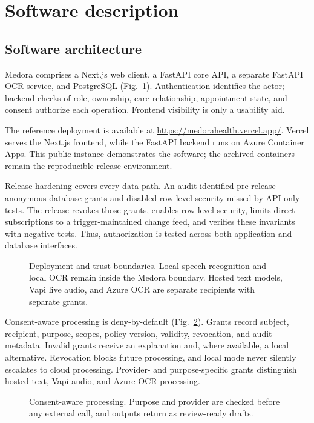 \documentclass[preprint,12pt,a4paper]{elsarticle}
\begin{document}
\section{Software description}

\subsection{Software architecture}

Medora comprises a Next.js web client, a FastAPI core API, a separate FastAPI OCR service,
and PostgreSQL (Fig.~\ref{fig:trust}). Authentication identifies the actor; backend checks
of role, ownership, care relationship, appointment state, and consent authorize each
operation. Frontend visibility is only a usability aid.

The reference deployment is available at
\url{https://medorahealth.vercel.app/}. Vercel serves the Next.js frontend, while the
FastAPI backend runs on Azure Container Apps. This public instance demonstrates the
software; the archived containers remain the reproducible release environment.

Release hardening covers every data path. An audit identified pre-release anonymous database
grants and disabled row-level security missed by API-only tests. The release revokes those
grants, enables row-level security, limits direct subscriptions to a trigger-maintained
change feed, and verifies these invariants with negative tests. Thus, authorization is
tested across both application and database interfaces.

\begin{figure}[!tb]
\centering
\caption{Deployment and trust boundaries. Local speech recognition and local OCR remain
inside the Medora boundary. Hosted text models, Vapi live audio, and Azure OCR are separate
recipients with separate grants.}
\label{fig:trust}
\end{figure}

Consent-aware processing is deny-by-default (Fig.~\ref{fig:consent}). Grants record subject,
recipient, purpose, scopes, policy version, validity, revocation, and audit metadata. Invalid
grants receive an explanation and, where available, a local alternative. Revocation blocks
future processing, and local mode never silently escalates to cloud processing. Provider-
and purpose-specific grants distinguish hosted text, Vapi audio, and Azure OCR processing.

\begin{figure}[!tb]
\centering
\caption{Consent-aware processing. Purpose and provider are checked before any external
call, and outputs return as review-ready drafts.}
\label{fig:consent}
\end{figure}
\end{document}
